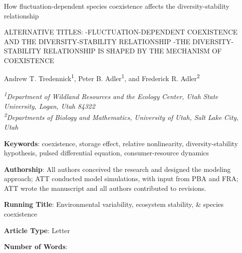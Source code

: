 \documentclass[12pt,]{article}
\title{}
\author{}
\date{}
\begin{document}
\maketitle


\renewcommand\linenumberfont{\normalfont\tiny\sffamily\color{gray}}

\begin{singlespace}

\begin{centering}

\Large{How fluctuation-dependent species coexistence affects the diversity-stability relationship}

ALTERNATIVE TITLES:
-FLUCTUATION-DEPENDENT COEXISTENCE AND THE DIVERSITY-STABILITY RELATIONSHIP
-THE DIVERSITY-STABILITY RELATIONSHIP IS SHAPED BY THE MECHANISM OF COEXISTENCE


\vspace{2.5em}

\renewcommand*{\thefootnote}{\fnsymbol{footnote}}

\normalsize{Andrew T. Tredennick\textsuperscript{1}, Peter B. Adler\textsuperscript{1}, and Frederick R. Adler\textsuperscript{2}}

\vspace{1.5em}

\textit{\small{\textsuperscript{1}Department of Wildland Resources and the Ecology Center, Utah State University, Logan, Utah 84322}} \\
\textit{\small{\textsuperscript{2}Departments of Biology and Mathematics, University of Utah, Salt Lake City, Utah}} 

\end{centering}

\vspace{3em}

\noindent \textbf{Keywords}: coexistence, storage effect, relative nonlinearity, diversity-stability hypothesis, pulsed differential equation, consumer-resource dynamics

\noindent \textbf{Authorship}: All authors conceived the research and designed the modeling approach; ATT conducted model simulations, with input from PBA and FRA; ATT wrote the manuscript and all authors contributed to revisions.

\noindent \textbf{Running Title}: Environmental variability, ecosystem stability, \& species coexistence

\noindent \textbf{Article Type}: Letter

\noindent \textbf{Number of Words}:


\end{singlespace}
\end{document}
